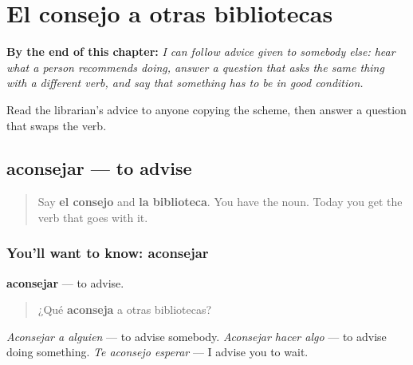 
\chapter{El consejo a otras bibliotecas}
\label{ch:es-consejo}

\begin{chapteropening}
\textbf{By the end of this chapter:} \emph{I can follow advice given to somebody else: hear what a person recommends doing, answer a question that asks the same thing with a different verb, and say that something has to be in good condition.}

Read the librarian's advice to anyone copying the scheme, then answer a question that swaps the verb.
\end{chapteropening}

\section[aconsejar]{aconsejar — to advise}

\label{lesson:ES-C473-aconsejar}



\begin{quote}
Say \textbf{el consejo} and \textbf{la biblioteca}. You have the noun. Today you get the verb that goes with it.
\end{quote}

\subsection*{You'll want to know: aconsejar}
\textbf{aconsejar} — to advise.

\begin{quote}
¿Qué \textbf{aconseja} a otras bibliotecas?
\end{quote}

\emph{Aconsejar a alguien} — to advise somebody. \emph{Aconsejar hacer algo} — to advise doing something. \emph{Te aconsejo esperar} — I advise you to wait.

